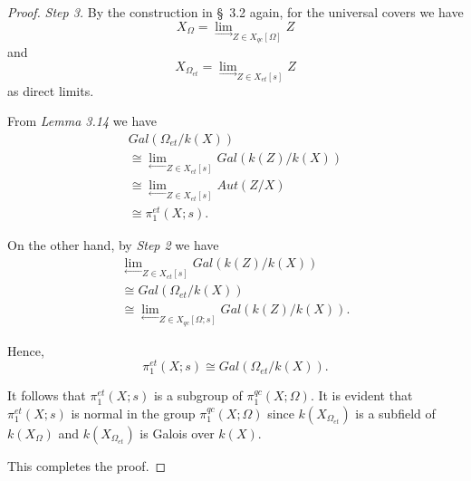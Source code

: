\documentclass[12pt,twoside,reqno]{amsart}
\theoremstyle{definition}
\numberwithin{equation}{section}
\begin{document}
\begin{proof}
\emph{Step 3.} By the construction in \S\ 3.2 again, for the universal
covers we have $$X_{\Omega }={\lim_{\rightarrow }}_{Z\in X_{qc}\left[ \Omega \right] }Z$$ and $$X_{\Omega _{et}}={\lim_{\rightarrow }}_{Z\in X_{et}\left[ s\right] }Z$$ as direct limits.

From \emph{Lemma 3.14} we have
\begin{equation*}
\begin{array}{l}
Gal\left( \Omega _{et}/k\left(
X\right) \right) \\

\cong {\lim_{\longleftarrow }}_{Z\in X_{et}\left[ s\right] }{Gal\left(
k\left( Z\right) /k\left( X\right) \right) }\\

\cong {\lim_{\longleftarrow }}_{Z\in X_{et}\left[ s\right] }{Aut\left(
Z/X\right) }\\

\cong {\pi }_{1}^{et}\left( X;s\right) .
\end{array}
\end{equation*}

On the other hand, by \emph{Step 2} we have
\begin{equation*}
\begin{array}{l}
{\lim_{\longleftarrow }}_{Z\in X_{et}\left[ s\right] }{Gal\left( k\left(
Z\right) /k\left( X\right) \right) }\\

\cong Gal\left( \Omega _{et}/k\left( X\right) \right) \\

\cong {\lim_{\longleftarrow }}_{Z\in X_{qc}\left[ \Omega ;s\right] }{Gal\left( k\left( Z\right) /k\left( X\right) \right) .}
\end{array}
\end{equation*}

Hence,
$${\pi }_{1}^{et}\left( X;s\right) \cong Gal\left( \Omega _{et}/k\left(
X\right) \right) .$$

It follows that ${\pi }_{1}^{et}\left( X;s\right) $ is a subgroup of ${\pi }_{1}^{qc}\left( X;\Omega \right) .$
It is evident that ${\pi }_{1}^{et}\left( X;s\right) $ is normal in the group ${\pi }_{1}^{qc}\left( X;\Omega \right) $ since $k\left( X_{\Omega _{et}}\right)$ is a subfield of
$k\left( X_{\Omega }\right) $ and $k\left( X_{\Omega _{et}}\right) $
is Galois over $k\left( X\right) $.

This completes the proof.
\end{proof}


\newpage
\end{document}

